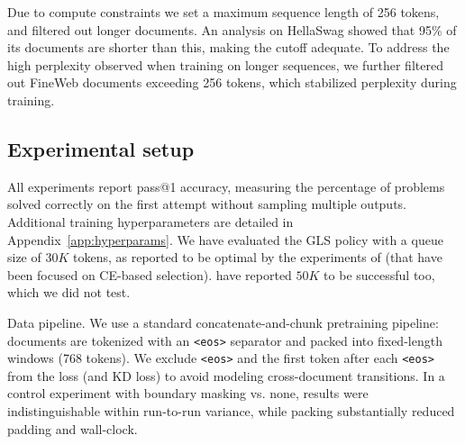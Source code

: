\documentclass[11pt]{article}
\begin{document}
Due to compute constraints we set a maximum sequence length of 256 tokens, and filtered out longer documents.
An analysis on HellaSwag showed that 95\% of its documents are shorter than this, making the cutoff adequate.
To address the high perplexity observed when training on longer sequences, we further filtered out FineWeb documents exceeding 256 tokens, which stabilized perplexity during training.

\subsection{Experimental setup}

All experiments report pass@1 accuracy, measuring the percentage of problems solved correctly on the first attempt without sampling multiple outputs.
Additional training hyperparameters are detailed in Appendix~\ref{app:hyperparams}.
We have evaluated the GLS policy with a queue size of $30K$ tokens, as reported to be optimal by the experiments of \citet{wang2021selectivekd} (that have been focused on CE-based selection).
\citep{wang2021selectivekd} have reported $50K$ to be successful too, which we did not test.

Data pipeline. We use a standard concatenate-and-chunk pretraining pipeline: documents are tokenized with an \texttt{<eos>} separator and packed into fixed-length windows (768 tokens).
We exclude \texttt{<eos>} and the first token after each \texttt{<eos>} from the loss (and KD loss) to avoid modeling cross-document transitions.
In a control experiment with boundary masking vs. none, results were indistinguishable within run-to-run variance, while packing substantially reduced padding and wall-clock.
\end{document}
